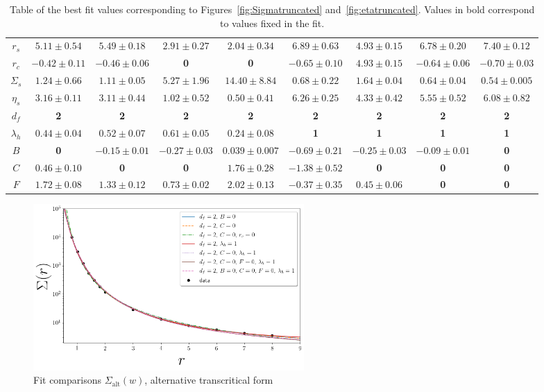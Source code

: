 \documentclass[reprint,amsmath,amssymb,aps,floatfix]{revtex4-1}
\begin{document}
\begin{table}
	\begin{tabular}{|c|c|c|c|c|c|c|c|c|}
		\hline
		$r_s$ & $5.11 \pm 0.54$ & $5.49 \pm 0.18$ & $2.91 \pm 0.27$ & $2.04 \pm 0.34$&  $6.89 \pm 0.63$ & $4.93 \pm 0.15$ & $6.78 \pm 0.20$ & $7.40 \pm 0.12$ \\
		$r_c$ & $-0.42 \pm 0.11$ & $-0.46 \pm 0.06$ & \textbf{0} & \textbf{0}&  $-0.65 \pm 0.10$ & $4.93 \pm 0.15$ & $-0.64 \pm 0.06$ & $-0.70 \pm 0.03$ \\
		$\Sigma_s$ & $1.24 \pm 0.66$ & $1.11 \pm 0.05$ & $5.27 \pm 1.96$ & $14.40 \pm 8.84$&  $0.68 \pm 0.22$ & $1.64 \pm 0.04$ & $0.64 \pm 0.04$ & $0.54 \pm 0.005$ \\
		$\eta_s$ & $3.16 \pm 0.11$ & $3.11 \pm 0.44$ & $1.02 \pm 0.52$ & $0.50 \pm 0.41$&  $6.26 \pm 0.25$ & $4.33 \pm 0.42$ & $5.55 \pm 0.52$ & $6.08 \pm 0.82$ \\
		$d_f$ & \textbf{2} & \textbf{2} & \textbf{2} & \textbf{2}& \textbf{2} & \textbf{2} & \textbf{2} & \textbf{2}\\
		$\lambda_h$ & $0.44 \pm 0.04$ & $0.52 \pm 0.07$ & $0.61 \pm 0.05$ & $0.24 \pm 0.08$& \textbf{1} & \textbf{1} & \textbf{1} & \textbf{1} \\
		$B$ & \textbf{0} & $-0.15 \pm 0.01$ & $-0.27 \pm 0.03$ & $0.039 \pm 0.007$ & $ -0.69 \pm 0.21$ & $-0.25 \pm 0.03$ & $-0.09 \pm 0.01$ & \textbf{0} \\
		$C$ & $0.46 \pm 0.10$ & \textbf{0} & \textbf{0} & $1.76 \pm 0.28$ &  $-1.38 \pm 0.52$ & \textbf{0} & \textbf{0} & \textbf{0} \\
		$F$ & $1.72 \pm 0.08$ & $1.33 \pm 0.12$ & $0.73 \pm 0.02$ & $2.02 \pm 0.13$&  $-0.37 \pm 0.35$ & $0.45 \pm 0.06$ & \textbf{0} & \textbf{0} \\
		\hline
	\end{tabular}
	\caption{	\label{tab:truncatedcompare} Table of the best fit values corresponding to Figures~\ref{fig:Sigmatruncated} and~\ref{fig:etatruncated}. Values in bold correspond to values fixed in the fit.}
\end{table}
%
\begin{figure}
	\includegraphics[width=0.5\textwidth]{Sigma_wellbehaved_comparison.png}
	\caption{Fit comparisons $\Sigma_{\textrm{alt}}(w)$, alternative transcritical form}
	\label{fig:Sigmawellbehaved}
\end{figure}
\end{document}
